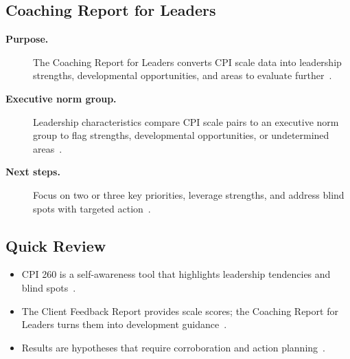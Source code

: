 \documentclass[../main.tex]{subfiles}
\begin{document}
\subsection{Coaching Report for Leaders}
\begin{description}
  \item[\textbf{Purpose.}] The Coaching Report for Leaders converts CPI scale data into leadership strengths, developmental opportunities, and areas to evaluate further~\autocite{edo-5-1-9-cpi-260-2025}.
  \item[\textbf{Executive norm group.}] Leadership characteristics compare CPI scale pairs to an executive norm group to flag strengths, developmental opportunities, or undetermined areas~\autocite{edo-5-1-9-cpi-260-2025}.
  \item[\textbf{Next steps.}] Focus on two or three key priorities, leverage strengths, and address blind spots with targeted action~\autocite{edo-5-1-9-cpi-260-2025}.
\end{description}

\subsection{Quick Review}
\begin{itemize}
  \item CPI 260 is a self-awareness tool that highlights leadership tendencies and blind spots~\autocite{edo-5-1-9-cpi-260-2025}.
  \item The Client Feedback Report provides scale scores; the Coaching Report for Leaders turns them into development guidance~\autocite{edo-5-1-9-cpi-260-2025}.
  \item Results are hypotheses that require corroboration and action planning~\autocite{edo-5-1-9-cpi-260-2025}.
\end{itemize}

\end{document}
